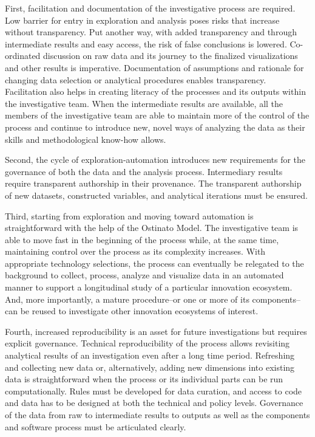 First, facilitation and documentation of the investigative process are required. Low barrier for entry in exploration and analysis poses risks that increase without transparency. Put another way, with added transparency and through intermediate results and easy access, the risk of false conclusions is lowered. Co-ordinated discussion on raw data and its journey to the finalized visualizations and other results is imperative. Documentation of assumptions and rationale for changing data selection or analytical procedures enables transparency. Facilitation also helps in creating literacy of the processes and its outputs within the investigative team. When the intermediate results are available, all the members of the investigative team are able to maintain more of the control of the process and continue to introduce new, novel ways of analyzing the data as their skills and methodological know-how allows.

Second, the cycle of exploration-automation introduces new requirements for the governance of both the data and the analysis process. Intermediary results require transparent authorship in their provenance. The transparent authorship of new datasets, constructed variables, and analytical iterations must be ensured.

Third, starting from exploration and moving toward automation is straightforward with the help of the Ostinato Model. The investigative team is able to move fast in the beginning of the process while, at the same time, maintaining control over the process as its complexity increases. With appropriate technology selections, the process can eventually be relegated to the background to collect, process, analyze and visualize data in an automated manner to support a longitudinal study of a particular innovation ecosystem. And, more importantly, a mature procedure--or one or more of its components--can be reused to investigate other innovation ecosystems of interest.

Fourth, increased reproducibility is an asset for future investigations but requires explicit governance. Technical reproducibility of the process allows revisiting analytical results of an investigation even after a long time period. Refreshing and collecting new data or, alternatively, adding new dimensions into existing data is straightforward when the process or its individual parts can be run computationally. Rules must be developed for data curation, and access to code and data has to be designed at both the technical and policy levels. 
Governance of the data from raw to intermediate results to outputs as well as the components and software process must be articulated clearly.

